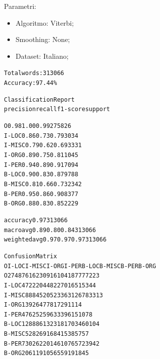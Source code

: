 \documentclass[a4paper,11pt,notitlepage]{report}
\begin{document}
\newpage
\noindent Parametri:
\begin{itemize}
 \item Algoritmo: Viterbi;
 \item Smoothing: None;
 \item Dataset: Italiano;
\end{itemize}
{\footnotesize
\begin{alltt}
Total words: 313066
Accuracy: 97.44\%

Classification Report
              precision    recall  f1-score   support

           O       0.98      1.00      0.99    275826
       I-LOC       0.86      0.73      0.79      3034
      I-MISC       0.79      0.62      0.69      3331
       I-ORG       0.89      0.75      0.81      1045
       I-PER       0.94      0.89      0.91      7094
       B-LOC       0.90      0.83      0.87      9788
      B-MISC       0.81      0.66      0.73      2342
       B-PER       0.95      0.86      0.90      8377
       B-ORG       0.88      0.83      0.85      2229

    accuracy                           0.97    313066
   macro avg       0.89      0.80      0.84    313066
weighted avg       0.97      0.97      0.97    313066

Confusion Matrix
             O   I-LOC  I-MISC   I-ORG   I-PER   B-LOC  B-MISC   B-PER   B-ORG
O       274876     162     309      16     104     187      77      72      23
I-LOC      472    2204      48      22      70     165      15      34       4
I-MISC     888      45    2052      33      63     126      78      33      13
I-ORG      139      26      47     781       7      29      11       1       4
I-PER      476      25      25       9    6333      96      15     107       8
B-LOC     1288      86      13       2      31    8170      34      60     104
B-MISC     528       2      69       1       6      84    1538      57      57
B-PER      730      26      22       0     146     107      65    7239      42
B-ORG      206       1      19      10       5      65      59      19    1845
\end{alltt}
}
\end{document}
